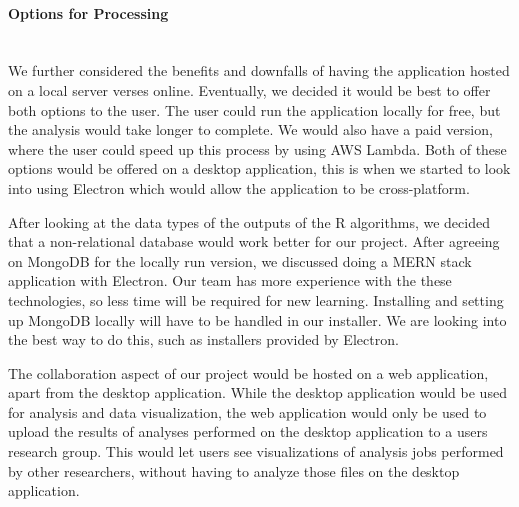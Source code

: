 \paragraph{Options for Processing} \mbox{}\\[\paragraphheaderspace]
We further considered the benefits and downfalls of having the application hosted on a local server verses online. Eventually, we decided it would be best to offer both options to the user. The user could run the application locally for free, but the analysis would take longer to complete. We would also have a paid version, where the user could speed up this process by using AWS Lambda. Both of these options would be offered on a desktop application, this is when we started to look into using Electron which would allow the application to be cross-platform.\par
After looking at the data types of the outputs of the  R algorithms, we decided that a non-relational database would work better for our project. After agreeing on MongoDB for the locally run version, we discussed doing a MERN stack application with Electron. Our team has more experience with the these technologies, so less time will be required for new learning. Installing and setting up MongoDB locally will have to be handled in our installer. We are looking into the best way to do this, such as installers provided by Electron.\par
The collaboration aspect of our project would be hosted on a web application, apart from the desktop application. While the desktop application would be used for analysis and data visualization, the web application would only be used to upload the results of analyses performed on the desktop application to a user\textquotesingle s research group. This would let users see visualizations of analysis jobs performed by other researchers, without having to analyze those files on the desktop application.\par

